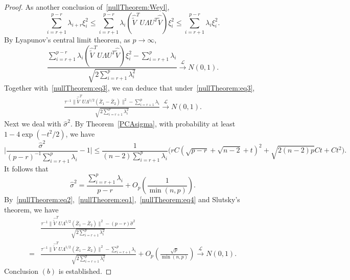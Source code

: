 \begin{proof}
As another conclusion of~\eqref{nullTheorem:Weyl},
    $$
    \sum_{i=r+1}^{p-r}\lambda_{i+r} \xi_i^2   \leq
    \sum_{i=r+1}^{p-r} \lambda_i (\hat{\tilde{V}}^T U \Lambda U^T \hat{\tilde{V}}) \xi_i^2
    \leq
\sum_{i=r+1}^{p-r}\lambda_i \xi_i^2.
    $$
By Lyapunov's central limit theorem, as $p\to \infty$,
$$
    \frac{
        \sum_{i=r+1}^{p-r} \lambda_i (\hat{\tilde{V}}^T U \Lambda U^T \hat{\tilde{V}}) \xi_i^2
    -\sum_{i=r+1}^{p}\lambda_i}{
    \sqrt{2\sum_{i=r+1}^p\lambda_i^2}
    }
    \xrightarrow{\mathcal{L}}N(0,1).
    $$
    Together with~\eqref{nullTheorem:eq3}, we can deduce that under~\eqref{nullTheorem:eq3},
\begin{equation}\label{nullTheorem:eq2}
\begin{split}
    \frac{
        \tau^{-1}\|\hat{\tilde{V}}^T U \Lambda^{1/2}(\bar{Z}_1-\bar{Z}_2)\|^2
        -\sum_{i=r+1}^p \lambda_i
    }
    {
    \sqrt{2\sum_{i=r+1}^p\lambda_i^2}
    }
    \xrightarrow{\mathcal{L}}N(0,1).
\end{split}
\end{equation}
Next we deal with $\hat{\sigma}^2$.
By Theorem~\ref{PCAsigma}, with probability at least $1-4\exp(-t^2/2)$, we have
\begin{equation}\label{nullTHeorem:eq10}
\Big|
\frac{\hat{\sigma}^2}{(p-r)^{-1}\sum_{i=r+1}^p \lambda_i}-1
\Big|
\leq
\frac{1}{(n-2)\sum_{i=r+1}^p \lambda_i}
\big(
rC(\sqrt{p-r}+\sqrt{n-2}+t)^2+\sqrt{2(n-2)p}Ct+Ct^2
\big).
\end{equation}
It follows that
\begin{equation}\label{nullTheorem:eq1}
\hat{\sigma}^2
    =\frac{\sum_{i=r+1}^p \lambda_i}{p-r}+O_p(\frac{1}{\min(n,p)}).
\end{equation}
By~\eqref{nullTheorem:eq2},~\eqref{nullTheorem:eq1},~\eqref{nullTheorem:eq4} and Slutsky's theorem, we have
\begin{equation}
\begin{split}
    &\frac{
        \tau^{-1}\|\hat{\tilde{V}}^T U \Lambda^{1/2}(\bar{Z}_1-\bar{Z}_2)\|^2
        -(p-r)\hat{\sigma}^2
    }
    {
    \sqrt{2\sum_{i=r+1}^p\lambda_i^2}
    }\\
    =&
    \frac{
        \tau^{-1}\|\hat{\tilde{V}}^T U \Lambda^{1/2}(\bar{Z}_1-\bar{Z}_2)\|^2
        -
    \sum_{i=r+1}^p \lambda_i
    }
    {
    \sqrt{2\sum_{i=r+1}^p\lambda_i^2}
    }
    +O_p(\frac{\sqrt{p}}{\min(n,p)})
    \xrightarrow{\mathcal{L}}N(0,1).
\end{split}
\end{equation}
Conclusion $(b)$ is established.




\end{proof}
